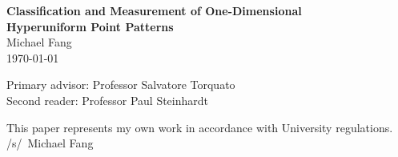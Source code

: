 \documentclass[11pt]{article}
\begin{document}
\enlargethispage{2\baselineskip}

\begin{center}
 {\Large \textbf{Classification and Measurement of One-Dimensional\\[0.3em]
 Hyperuniform Point Patterns}}\\[1.4ex]
 Michael Fang \\[0.5ex]
 \today
\end{center}

\noindent
{\small
\begin{minipage}{\textwidth}
\centering

\begin{minipage}[t]{0.44\textwidth}\vspace{0pt}
Primary advisor: Professor Salvatore Torquato\\
Second reader: Professor Paul Steinhardt
\end{minipage}
\hspace{0.04\textwidth}%
\begin{minipage}[t]{0.40\textwidth}\vspace{0pt}
\raggedleft
This paper represents my own work in accordance with University regulations.\\
/s/\ Michael Fang
\end{minipage}

\end{minipage}
}
\vspace{-0.45cm}
\end{document}
